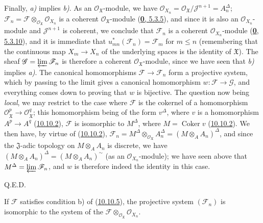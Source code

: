 Finally, \emph{a)} implies \emph{b)}. As an
$\mathscr{O}_{\mathfrak{X}}$-module, we have
$\mathscr{O}_{X_n}=\mathscr{O}_{\mathfrak{X}}/
\mathscr{J}^{n+1}=A_n^\Delta$; $\mathscr{F}_n=\mathscr{F}
\otimes_{\mathscr{O}_{\mathfrak{X}}}\mathscr{O}_{X_n}$ is a coherent
$\mathscr{O}_{\mathfrak{X}}$-module
(\hyperref[0.5.3.5]{\textbf{0}, 5.3.5}), and since it is also an
$\mathscr{O}_{X_n}$-module and $\mathscr{J}^{n+1}$ is coherent,
we conclude that $\mathscr{F}_n$ is a coherent
$\mathscr{O}_{X_n}$-module
(\hyperref[0.5.3.10]{\textbf{0}, 5.3.10}), and it is immediate that
$u_{mn}^*(\mathscr{F}_n)=\mathscr{F}_m$ for $m\leq n$ (remembering
that the continuous map $X_m\to X_n$ of the underlying spaces is the
identity of $\mathfrak{X}$). The sheaf
$\mathscr{G}=\varprojlim\mathscr{F}_n$ is therefore a coherent
$\mathscr{O}_{\mathfrak{X}}$-module, since we have seen that \emph{b)}
implies \emph{a)}. The canonical homomorphisms
$\mathscr{F}\to\mathscr{F}_n$ form a projective system, which by
passing to the limit gives a canonical homomorphism
$w:\mathscr{F}\to\mathscr{G}$, and everything comes down to proving that
$w$ is bijective. The question now being \emph{local}, we may restrict to the
case where $\mathscr{F}$ is the cokernel of a homomorphism
$\mathscr{O}_{\mathfrak{X}}^p\to\mathscr{O}_{\mathfrak{X}}^q$; this
homomorphism being of the form $v^\Delta$, where $v$ is a homomorphism
$A^p\to A^q$ (\hyperref[I.10.10.2]{10.10.2}), $\mathscr{F}$ is
isomorphic to $M^\Delta$, where $M=\operatorname{Coker}v$
(\hyperref[I.10.10.2]{10.10.2}). We then have, by virtue of
(\hyperref[I.10.10.2]{10.10.2}),
$\mathscr{F}_n=M^\Delta\otimes_{\mathscr{O}_{\mathfrak{X}}}A_n^\Delta
=(M\otimes_A A_n)^\Delta$, and since the $\mathfrak{J}$-adic topology
on $M\otimes_A A_n$ is discrete, we have
$(M\otimes_A A_n)^\Delta=(M\otimes_A A_n)^{\sim}$ (as an
$\mathscr{O}_{X_n}$-module); we have seen above that
$M^\Delta=\varprojlim\mathscr{F}_n$, and $w$ is therefore indeed the
identity in this case.
\par\hfill Q.E.D.\par

\begin{corollary}[10.10.6]
\label{I.10.10.6}
If $\mathscr{F}$ satisfies condition \textup{b)} of
\textup{(\hyperref[I.10.10.5]{10.10.5})}, the projective system
$(\mathscr{F}_n)$ is isomorphic to the system of the
$\mathscr{F}\otimes_{\mathscr{O}_{\mathfrak{X}}}\mathscr{O}_{X_n}$.
\end{corollary}

